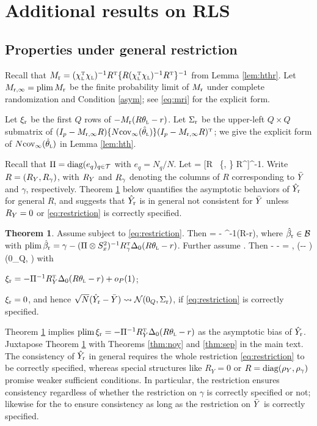 \documentclass[11pt]{article}
\theoremstyle{definition}
\newtheorem{theorem}{Theorem}
\begin{document}
\section{Additional results on RLS}\label{sec:rls_app_res} 
\subsection{Properties under general restriction}
Recall that $M_{\textup{r}}=  (\chi_{\textsc{l}}^{ \mathrm{\scriptscriptstyle T} }\chi_{\textsc{l}})^{-1} R^{ \mathrm{\scriptscriptstyle T} }\{R (\chi_{\textsc{l}}^{ \mathrm{\scriptscriptstyle T} }\chi_{\textsc{l}})^{-1} R^{ \mathrm{\scriptscriptstyle T} }\}^{-1}$ from Lemma \ref{lem:hthr}. 
Let $M_{\textup{r},\infty} = \textup{plim\,} M_{\textup{r}}$ be the finite probability limit of $M_{\textup{r}}$ under complete randomization and Condition \ref{asym}; see \eqref{eq:mri} for the explicit form. 

Let $\xi_{\textup{r}}$ be the first $Q$ rows of $- M_{\textup{r}}(R\theta_{\textsc{l}} - r) $. 
Let $\Sigma_{\textup{r}}$ be the upper-left $Q\times Q$ submatrix of $(I_p - M_{\textup{r},\infty} R) {\{N \text{cov}_\infty(\hat\theta_{\textsc{l}})\}} (I_p - M_{\textup{r},\infty} R)^{ \mathrm{\scriptscriptstyle T} }$; we give the explicit form of $N \text{cov}_\infty(\hat\theta_{\textsc{l}})$ in   Lemma \ref{lem:hth}.


Recall that $\Pi = \text{diag}(e_q)_{q\in\mathcal{T}}$ with $e_q = N_q/N$. 
Let 
\begina
\dz  = [R \ \diag\{\einv, \esinv\} R^\T]^{-1}.
\enda 
Write $R = (R_Y, R_\gamma)$, with $R_Y$ and $R_\gamma$ denoting the columns of $R$ corresponding to $\bar Y$ and $\gamma$, respectively. 
Theorem \ref{thm:rls_g} below quantifies the asymptotic behaviors of $\hat Y_{\textup{r}} $ for general $R$, and suggests that $\hat Y_{\textup{r}} $ is in general not consistent for $\bar Y$ unless $R_Y = 0$ or \eqref{eq:restriction} is correctly specified. 


\begin{theorem}\label{thm:rls_g}
Assume \rlss subject to \eqref{eq:restriction}. Then 
\begina
\hyr  = \hybr  -  \einv \ryt  [ R \{N\ccinvl\} R^\T ]^{-1}(R\hthl-r),
\enda where $\hat\beta_{\textup{r}} \in \mathcal{B}$ with $\textup{plim\,}\hat\beta_{\textup{r}} = \gamma -   (\Pi\otimes S^2_{x} )^{-1} R_\gamma^{ \mathrm{\scriptscriptstyle T} } \Delta_0  (R\theta_{\textsc{l}}  - r) $. 
Further assume \creasym. Then 
\begina
\hyr  - \by  -  \xir =  \op, \qquad \sqrtn(\hyr   -\by - \xir ) \rs  \mn(0_{Q}, \sri)
\enda
with 
\begine[(i)]
\item $ \xi_{\textup{r}}=  - \Pi^{-1}  R_Y^{ \mathrm{\scriptscriptstyle T} }  \Delta_0(R\theta_{\textsc{l}}  -r)+o_P(1)$;
\item $\xi_{\textup{r}} = 0$, and hence   $\sqrt N(\hat Y_{\textup{r}}  -\bar Y) \rightsquigarrow  \mathcal{N}(0_{Q}, \Sigma_{\textup{r}})$, if \eqref{eq:restriction} is correctly specified.  
\ende
\end{theorem}

Theorem \ref{thm:rls_g} implies $\textup{plim\,} \xi_{\textup{r}} = - \Pi^{-1}  R_Y^{ \mathrm{\scriptscriptstyle T} }  \Delta_0(R\theta_{\textsc{l}}  -r)$ as the asymptotic bias of $\hat Y_{\textup{r}}$. Juxtapose Theorem \ref{thm:rls_g} with Theorems \ref{thm:noy} and \ref{thm:sep} in the main text. 
The consistency of $\hat Y_{\textup{r}}$ in general requires the whole restriction \eqref{eq:restriction} to be correctly specified,  whereas 
special structures like $R_Y = 0$ or $R = \text{diag}(\rho_Y, \rho_\gamma)$ promise weaker sufficient conditions.
In particular, the {\go} restriction ensures consistency regardless of whether the restriction on $\gamma$ is correctly specified or not; likewise for the {\sr}  to ensure consistency as long as the restriction on $\bar Y$ is correctly specified. 
\end{document}
